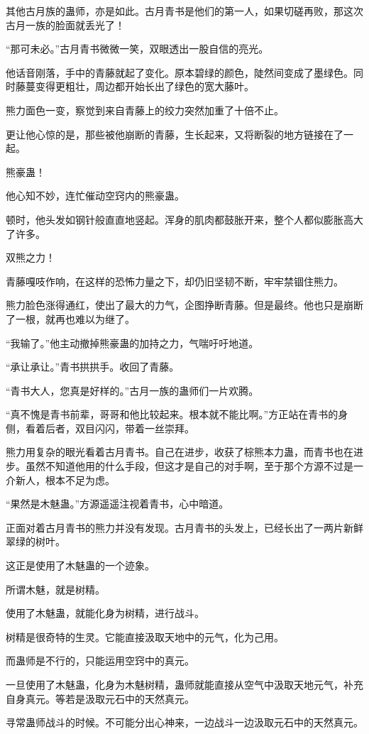 \begin{this_body}
其他古月族的蛊师，亦是如此。古月青书是他们的第一人，如果切磋再败，那这次古月一族的脸面就丢光了！

“那可未必。”古月青书微微一笑，双眼透出一股自信的亮光。

他话音刚落，手中的青藤就起了变化。原本碧绿的颜色，陡然间变成了墨绿色。同时藤蔓变得更粗壮，周边都开始长出了绿色的宽大藤叶。

熊力面色一变，察觉到来自青藤上的绞力突然加重了十倍不止。

更让他心惊的是，那些被他崩断的青藤，生长起来，又将断裂的地方链接在了一起。

熊豪蛊！

他心知不妙，连忙催动空窍内的熊豪蛊。

顿时，他头发如钢针般直直地竖起。浑身的肌肉都鼓胀开来，整个人都似膨胀高大了许多。

双熊之力！

青藤嘎吱作响，在这样的恐怖力量之下，却仍旧坚韧不断，牢牢禁锢住熊力。

熊力脸色涨得通红，使出了最大的力气，企图挣断青藤。但是最终。他也只是崩断了一根，就再也难以为继了。

“我输了。”他主动撤掉熊豪蛊的加持之力，气喘吁吁地道。

“承让承让。”青书拱拱手。收回了青藤。

“青书大人，您真是好样的。”古月一族的蛊师们一片欢腾。

“真不愧是青书前辈，哥哥和他比较起来。根本就不能比啊。”方正站在青书的身侧，看着后者，双目闪闪，带着一丝崇拜。

熊力用复杂的眼光看着古月青书。自己在进步，收获了棕熊本力蛊，而青书也在进步。虽然不知道他用的什么手段，但这才是自己的对手啊，至于那个方源不过是一介新人，根本不足为虑。

“果然是木魅蛊。”方源遥遥注视着青书，心中暗道。

正面对着古月青书的熊力并没有发现。古月青书的头发上，已经长出了一两片新鲜翠绿的树叶。

这正是使用了木魅蛊的一个迹象。

所谓木魅，就是树精。

使用了木魅蛊，就能化身为树精，进行战斗。

树精是很奇特的生灵。它能直接汲取天地中的元气，化为己用。

而蛊师是不行的，只能运用空窍中的真元。

一旦使用了木魅蛊，化身为木魅树精，蛊师就能直接从空气中汲取天地元气，补充自身真元。等若是汲取元石中的天然真元。

寻常蛊师战斗的时候。不可能分出心神来，一边战斗一边汲取元石中的天然真元。


\end{this_body}
